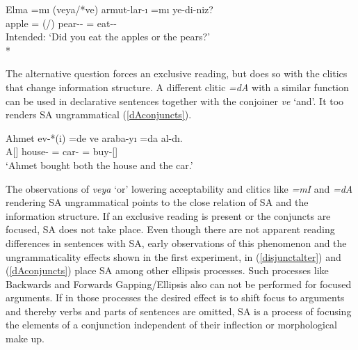 \begin{exe}
    \ex \label{disjunctalter}
    \gll *Elma =mı (veya/*ve) armut-lar-ı =mı ye-di-niz? \\ 
    apple ={\Q} (\Or/\And) pear-{\Pl}-{\Acc} ={\Q} eat-{\Pst}-{\Spl}  \\
    \glt Intended: `Did you eat the apples or the pears?' \\*
\end{exe}

The alternative question forces an exclusive reading, but does so with the clitics that change information structure. A different clitic \textit{=dA} with a similar function can be used in declarative sentences together with the conjoiner \textit{ve} `and'. It too renders SA ungrammatical (\ref{dAconjuncts}).

\begin{exe}
    \ex \label{dAconjuncts} 
    \gll Ahmet ev-*(i) =de ve araba-yı =da al-dı. \\ A[{\Nom}] 
    house-{\Acc} ={\Foc} {\And} car-{\Acc} ={\Foc} buy-{\Pst}[{\Tsg}] \\
    \glt `Ahmet bought both the house and the car.'
\end{exe}

The observations of \textit{veya} `or' lowering acceptability and clitics like \textit{=mI} and \textit{=dA} rendering SA ungrammatical points to the close relation of SA and the information structure. If an exclusive reading is present or the conjuncts are focused, SA does not take place. Even though there are not apparent reading differences in sentences with SA, early observations of this phenomenon \citep{emre1945turk} and the ungrammaticality effects shown in the first experiment, in (\ref{disjunctalter}) and (\ref{dAconjuncts}) place SA among other ellipsis processes. Such processes like Backwards and Forwards Gapping/Ellipsis also can not be performed for focused arguments. If in those processes the desired effect is to shift focus to arguments and thereby verbs and parts of sentences are omitted, SA is a process of focusing the elements of a conjunction independent of their inflection or morphological make up.

